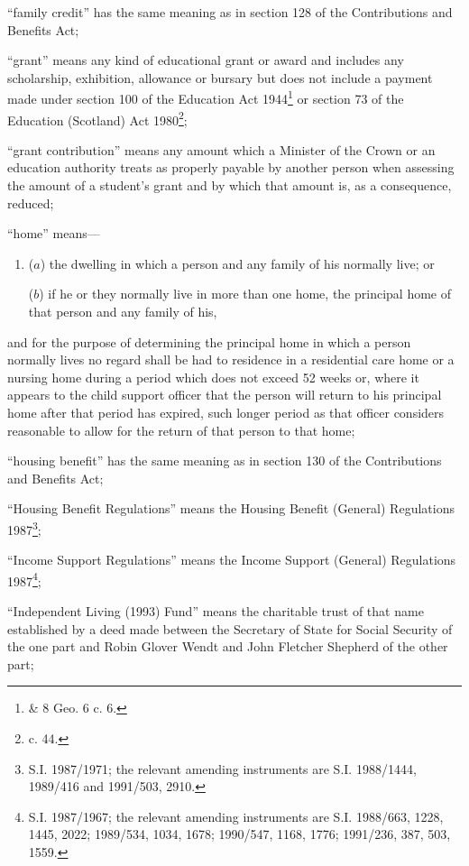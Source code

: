 \documentclass[12pt,a4paper]{article}
\begin{document}
\begin{enumerate}
“family credit” has the same meaning as in section 128 of the Contributions and Benefits Act;

“grant” means any kind of educational grant or award and includes any scholarship, exhibition, allowance or bursary but does not include a payment made under section 100 of the Education Act 1944\footnote{ \& 8 Geo. 6 c. 6.} or section 73 of the Education (Scotland) Act 1980\footnote{ c. 44.};

“grant contribution” means any amount which a Minister of the Crown or an education authority treats as properly payable by another person when assessing the amount of a student’s grant and by which that amount is, as a consequence, reduced;

“home” means—
\begin{enumerate}\item[]
($a$)
the dwelling in which a person and any family of his normally live; or

($b$)
if he or they normally live in more than one home, the principal home of that person and any family of his,
\end{enumerate}
and for the purpose of determining the principal home in which a person normally lives no regard shall be had to residence in a residential care home or a nursing home during a period which does not exceed 52 weeks or, where it appears to the child support officer that the person will return to his principal home after that period has expired, such longer period as that officer considers reasonable to allow for the return of that person to that home;

“housing benefit” has the same meaning as in section 130 of the Contributions and Benefits Act;

“Housing Benefit Regulations” means the Housing Benefit (General) Regulations 1987\footnote{\frenchspacing S.I. 1987/1971; the relevant amending instruments are S.I. 1988/1444, 1989/416 and 1991/503, 2910.};

“Income Support Regulations” means the Income Support (General) Regulations 1987\footnote{\frenchspacing S.I. 1987/1967; the relevant amending instruments are S.I. 1988/663, 1228, 1445, 2022; 1989/534, 1034, 1678; 1990/547, 1168, 1776; 1991/236, 387, 503, 1559.};

“Independent Living (1993) Fund” means the charitable trust of that name established by a deed made between the Secretary of State for Social Security of the one part and Robin Glover Wendt and John Fletcher Shepherd of the other part;


\end{enumerate}
\end{document}
